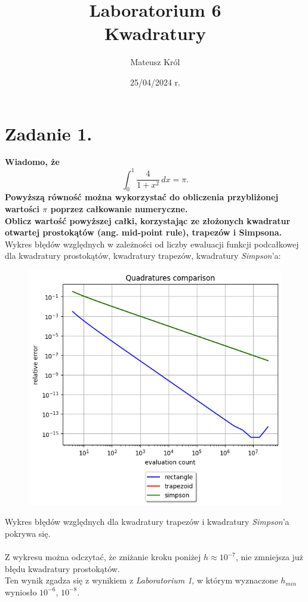 \documentclass{article}
\title{%
Laboratorium 6\\
  \huge Kwadratury}
\author{Mateusz Król}
\date{25/04/2024 r.}
\begin{document}
\maketitle

 
\section*{Zadanie 1.}
\textbf{Wiadomo, że $$ \int_{0}^{1} \frac{4}{1+x^2} \,dx = \pi.$$
\quad
Powyższą równość można wykorzystać do obliczenia przybliżonej
wartości $\pi$ poprzez całkowanie numeryczne. \\
\null\quad
Oblicz wartość powyższej całki, korzystając ze
złożonych kwadratur otwartej prostokątów (ang. mid-point rule), 
trapezów i Simpsona.}
\newpage
Wykres błędów względnych w zależności od liczby ewaluacji
funkcji podcałkowej dla kwadratury prostokątów, kwadratury trapezów,
kwadratury \textit{Simpson}'a:
\begin{figure}[H]
  \includegraphics[width=\linewidth]{figures/quad.png}
\end{figure}
Wykres błędów względnych dla kwadratury trapezów i kwadratury \textit{Simpson}'a
pokrywa się.
\\\\
\null\quad
Z wykresu można odczytać, że zniżanie kroku poniżej $h \approx 10^{-7}$, 
nie zmniejsza już błędu kwadratury prostokątów. \\
Ten wynik zgadza się z wynikiem z \textit{Laboratorium 1}, w którym
wyznaczone $h_{min}$ wyniosło $10^{-6}$, $10^{-8}$.
\end{document}
